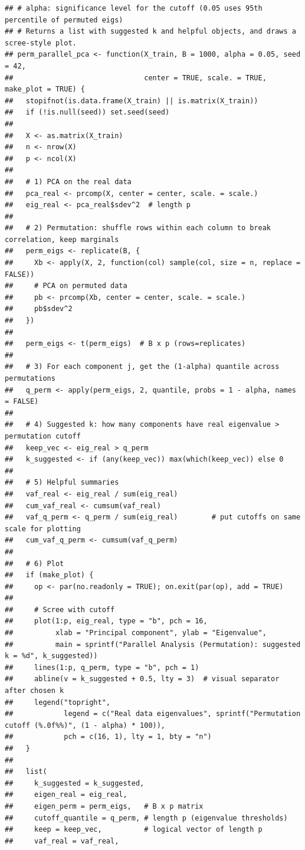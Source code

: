 \documentclass[
]{article}
\begin{document}
\begin{verbatim}
## # alpha: significance level for the cutoff (0.05 uses 95th percentile of permuted eigs)
## # Returns a list with suggested k and helpful objects, and draws a scree-style plot.
## perm_parallel_pca <- function(X_train, B = 1000, alpha = 0.05, seed = 42,
##                               center = TRUE, scale. = TRUE, make_plot = TRUE) {
##   stopifnot(is.data.frame(X_train) || is.matrix(X_train))
##   if (!is.null(seed)) set.seed(seed)
##   
##   X <- as.matrix(X_train)
##   n <- nrow(X)
##   p <- ncol(X)
##   
##   # 1) PCA on the real data
##   pca_real <- prcomp(X, center = center, scale. = scale.)
##   eig_real <- pca_real$sdev^2  # length p
##   
##   # 2) Permutation: shuffle rows within each column to break correlation, keep marginals
##   perm_eigs <- replicate(B, {
##     Xb <- apply(X, 2, function(col) sample(col, size = n, replace = FALSE))
##     # PCA on permuted data
##     pb <- prcomp(Xb, center = center, scale. = scale.)
##     pb$sdev^2
##   })
##   
##   perm_eigs <- t(perm_eigs)  # B x p (rows=replicates)
##   
##   # 3) For each component j, get the (1-alpha) quantile across permutations
##   q_perm <- apply(perm_eigs, 2, quantile, probs = 1 - alpha, names = FALSE)
##   
##   # 4) Suggested k: how many components have real eigenvalue > permutation cutoff
##   keep_vec <- eig_real > q_perm
##   k_suggested <- if (any(keep_vec)) max(which(keep_vec)) else 0
##   
##   # 5) Helpful summaries
##   vaf_real <- eig_real / sum(eig_real)
##   cum_vaf_real <- cumsum(vaf_real)
##   vaf_q_perm <- q_perm / sum(eig_real)        # put cutoffs on same scale for plotting
##   cum_vaf_q_perm <- cumsum(vaf_q_perm)
##   
##   # 6) Plot
##   if (make_plot) {
##     op <- par(no.readonly = TRUE); on.exit(par(op), add = TRUE)
##     
##     # Scree with cutoff
##     plot(1:p, eig_real, type = "b", pch = 16,
##          xlab = "Principal component", ylab = "Eigenvalue",
##          main = sprintf("Parallel Analysis (Permutation): suggested k = %d", k_suggested))
##     lines(1:p, q_perm, type = "b", pch = 1)
##     abline(v = k_suggested + 0.5, lty = 3)  # visual separator after chosen k
##     legend("topright",
##            legend = c("Real data eigenvalues", sprintf("Permutation cutoff (%.0f%%)", (1 - alpha) * 100)),
##            pch = c(16, 1), lty = 1, bty = "n")
##   }
##   
##   list(
##     k_suggested = k_suggested,
##     eigen_real = eig_real,
##     eigen_perm = perm_eigs,   # B x p matrix
##     cutoff_quantile = q_perm, # length p (eigenvalue thresholds)
##     keep = keep_vec,          # logical vector of length p
##     vaf_real = vaf_real,

\end{verbatim}
\end{document}
